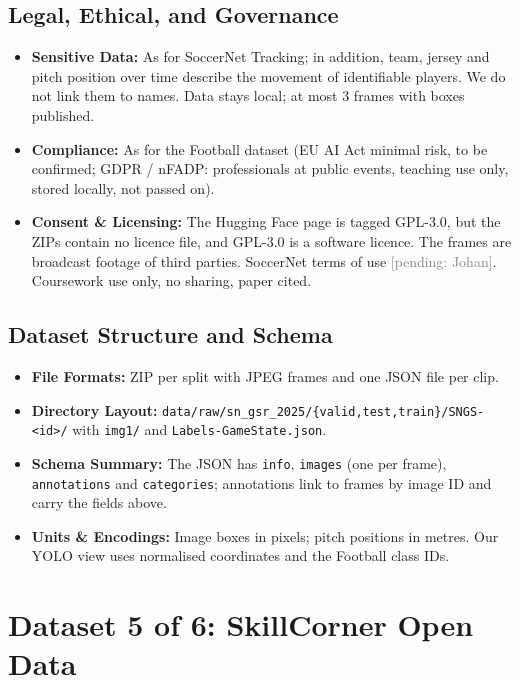 \documentclass[11pt, a4paper]{article}
\newif\ifreportednoted
\newcommand{\resetreported}{\global\reportednotedfalse}
\newcommand{\pending}[1]{\textcolor{gray}{[pending: #1]}}
\begin{document}
\subsection{Legal, Ethical, and Governance}
\begin{itemize}
    \item \textbf{Sensitive Data:} As for SoccerNet Tracking; in addition, team, jersey and pitch position over time describe the movement of identifiable players. We do not link them to names. Data stays local; at most 3 frames with boxes published.
    \item \textbf{Compliance:} As for the Football dataset (EU AI Act minimal risk, to be confirmed; GDPR / nFADP: professionals at public events, teaching use only, stored locally, not passed on).
    \item \textbf{Consent \& Licensing:} The Hugging Face page is tagged GPL-3.0, but the ZIPs contain no licence file, and GPL-3.0 is a software licence. The frames are broadcast footage of third parties. SoccerNet terms of use \pending{Johan}. Coursework use only, no sharing, paper cited.
\end{itemize}

\subsection{Dataset Structure and Schema}
\begin{itemize}
    \item \textbf{File Formats:} ZIP per split with JPEG frames and one JSON file per clip.
    \item \textbf{Directory Layout:} \texttt{data/raw/sn\_gsr\_2025/\{valid,test,train\}/SNGS-<id>/} with \texttt{img1/} and \texttt{Labels-GameState.json}.
    \item \textbf{Schema Summary:} The JSON has \texttt{info}, \texttt{images} (one per frame), \texttt{annotations} and \texttt{categories}; annotations link to frames by image ID and carry the fields above.
    \item \textbf{Units \& Encodings:} Image boxes in pixels; pitch positions in metres. Our YOLO view uses normalised coordinates and the Football class IDs.
\end{itemize}

\section{Dataset 5 of 6: SkillCorner Open Data}
\resetreported
\end{document}
